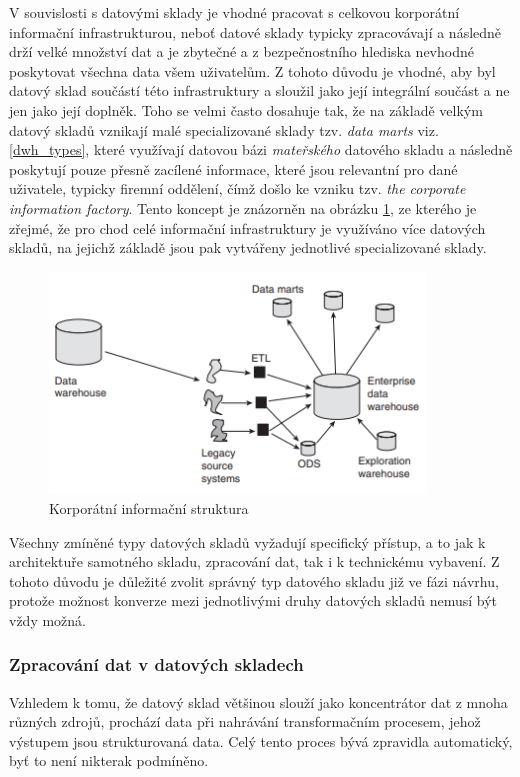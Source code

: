 \documentclass[
  digital,     %
  twoside,     %
  lof,         %
  lot,         %
]{fithesis4}
\begin{document}
V souvislosti s datovými sklady je vhodné pracovat s celkovou korporátní informační infrastrukturou, neboť datové sklady typicky zpracovávají a následně drží velké množství dat a je zbytečné a z bezpečnostního hlediska nevhodné poskytovat všechna data všem uživatelům. Z tohoto důvodu je vhodné, aby byl datový sklad součástí této infrastruktury a sloužil jako její integrální součást a ne jen jako její doplněk. Toho se velmi často dosahuje tak, že na základě velkým datový skladů vznikají malé specializované sklady tzv. \emph{data marts} viz. \ref{dwh_types}, které využívají datovou bázi \emph{mateřského} datového skladu a následně poskytují pouze přesně zacílené informace, které jsou relevantní pro dané uživatele, typicky firemní oddělení, čímž došlo ke vzniku tzv. \emph{the corporate information factory}.\parencite{Inmon2021} Tento koncept je znázorněn na obrázku \ref{fig:data_marts_schema}, ze kterého je zřejmé, že pro chod celé informační infrastruktury je využíváno více datových skladů, na jejichž základě jsou pak vytvářeny jednotlivé specializované sklady.

\begin{figure}[h]
  \begin{center}
          \includegraphics[width=10cm]{img/data_marts_schema.png}
  \end{center}
  \caption{Korporátní informační struktura \parencite[s.12]{Inmon2008}}
  \label{fig:data_marts_schema}
\end{figure}  

Všechny zmíněné typy datových skladů vyžadují specifický přístup, a to jak
k architektuře samotného skladu, zpracování dat, tak i k technickému vybavení. Z tohoto
důvodu je důležité zvolit správný typ datového skladu již ve fázi návrhu, protože
možnost konverze mezi jednotlivými druhy datových skladů nemusí být vždy možná.

\subsubsection{Zpracování dat v datových skladech}
Vzhledem k tomu, že datový sklad většinou slouží jako koncentrátor dat z mnoha různých zdrojů, prochází data při nahrávání transformačním procesem, jehož výstupem jsou strukturovaná data. Celý tento proces bývá zpravidla automatický, byť to není nikterak podmíněno.
\end{document}

